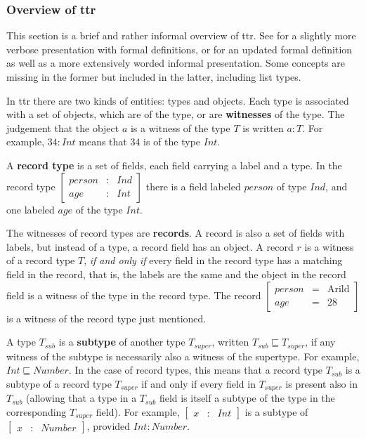 \subsubsection{Overview of \gls{ttr}}

This section is a brief and rather informal overview of \gls{ttr}.
See \cite{CooperTypetheorysemantics2012} for a slightly more verbose presentation with formal definitions, or \cite{CooperTypetheorylanguage2016} for an updated formal definition as well as a more extensively worded informal presentation.
Some concepts are missing in the former but included in the latter, including list types.

In \gls{ttr} there are two kinds of entities: types and objects.
Each type is associated with a set of objects, which are of the type, or are \textbf{witnesses} of the type.
The judgement that the object $a$ is a witness of the type $T$ is written $a : T$.
For example, $34 : Int$ means that $34$ is of the type $Int$.

A \textbf{record type} is a set of fields, each field carrying a label and a type.
In the record type $\left[ \begin{array}{rcl} person &:& Ind \\ age &:& Int \end{array} \right]$ there is a field labeled $person$ of type $Ind$, and one labeled $age$ of the type $Int$.

The witnesses of record types are \textbf{records}.
A record is also a set of fields with labels, but instead of a type, a record field has an object.
A record $r$ is a witness of a record type $T$, \textit{if and only if} every field in the record type has a matching field in the record, that is, the labels are the same and the object in the record field is a witness of the type in the record type.
The record $\left[ \begin{array}{rcl} person &=& \text{Arild} \\ age &=& 28 \end{array} \right]$ is a witness of the record type just mentioned.


A type $T_{sub}$ is a \textbf{subtype} of another type $T_{super}$, written $T_{sub} \sqsubseteq T_{super}$, if any witness of the subtype is necessarily also a witness of the supertype.
For example, $Int \sqsubseteq Number$.
In the case of record types, this means that a record type $T_{sub}$ is a subtype of a record type $T_{super}$ if and only if every field in $T_{super}$ is present also in $T_{sub}$ (allowing that a type in a $T_{sub}$ field is itself a subtype of the type in the corresponding $T_{super}$ field).
For example, $\left[ \begin{array}{rcl} x &:& Int \end{array} \right]$ is a subtype of $\left[ \begin{array}{rcl} x &:& Number \end{array} \right]$, provided $Int : Number$.

